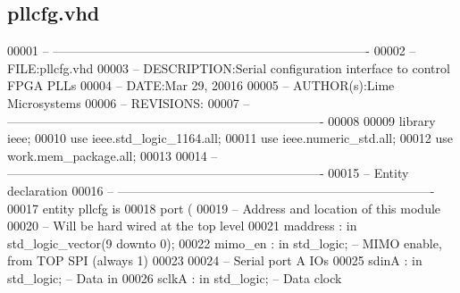 \subsection{pllcfg.\+vhd}
\label{pllcfg_8vhd_source}

\begin{DoxyCode}
00001 \textcolor{keyword}{-- ----------------------------------------------------------------------------}
00002 \textcolor{keyword}{-- FILE:pllcfg.vhd}
00003 \textcolor{keyword}{-- DESCRIPTION:Serial configuration interface to control FPGA PLLs}
00004 \textcolor{keyword}{-- DATE:Mar 29, 20016}
00005 \textcolor{keyword}{-- AUTHOR(s):Lime Microsystems}
00006 \textcolor{keyword}{-- REVISIONS:}
00007 \textcolor{keyword}{-- ----------------------------------------------------------------------------}
00008 
00009 \textcolor{vhdlkeyword}{library }\textcolor{keywordflow}{ieee};
00010 \textcolor{vhdlkeyword}{use }ieee.std\_logic\_1164.\textcolor{keywordflow}{all};
00011 \textcolor{vhdlkeyword}{use }ieee.numeric\_std.\textcolor{keywordflow}{all};
00012 \textcolor{vhdlkeyword}{use }work.mem_package.\textcolor{keywordflow}{all};
00013 
00014 \textcolor{keyword}{-- ----------------------------------------------------------------------------}
00015 \textcolor{keyword}{-- Entity declaration}
00016 \textcolor{keyword}{-- ----------------------------------------------------------------------------}
00017 \textcolor{keywordflow}{entity }pllcfg \textcolor{keywordflow}{is}
00018    \textcolor{keywordflow}{port} \textcolor{vhdlchar}{(}
00019 \textcolor{keyword}{      -- Address and location of this module}
00020 \textcolor{keyword}{      -- Will be hard wired at the top level}
00021       \textcolor{vhdlchar}{maddress} \textcolor{vhdlchar}{:} \textcolor{keywordflow}{in} \textcolor{comment}{std\_logic\_vector}\textcolor{vhdlchar}{(}\textcolor{vhdllogic}{}\textcolor{vhdllogic}{9} \textcolor{keywordflow}{downto} \textcolor{vhdllogic}{}\textcolor{vhdllogic}{0}\textcolor{vhdlchar}{)};
00022       \textcolor{vhdlchar}{mimo_en}  \textcolor{vhdlchar}{:} \textcolor{keywordflow}{in} \textcolor{comment}{std\_logic};\textcolor{keyword}{ -- MIMO enable, from TOP SPI (always 1)}
00023       
00024 \textcolor{keyword}{      -- Serial port A IOs}
00025       \textcolor{vhdlchar}{sdinA}    \textcolor{vhdlchar}{:} \textcolor{keywordflow}{in} \textcolor{comment}{std\_logic};\textcolor{keyword}{ -- Data in}
00026       \textcolor{vhdlchar}{sclkA}    \textcolor{vhdlchar}{:} \textcolor{keywordflow}{in} \textcolor{comment}{std\_logic};\textcolor{keyword}{ -- Data clock}

\end{DoxyCode}
